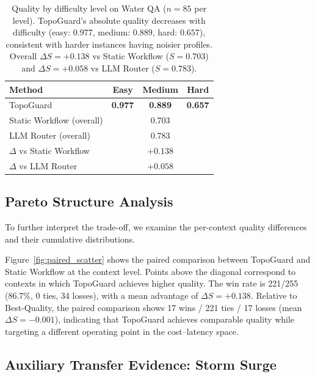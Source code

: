 \documentclass[manuscript,review,anonymous]{acmart}
\begin{document}
\begin{table}[t]
\centering
\caption{Quality by difficulty level on Water QA ($n=85$ per level). TopoGuard's absolute quality decreases with difficulty (easy: $0.977$, medium: $0.889$, hard: $0.657$), consistent with harder instances having noisier profiles. Overall $\Delta S=+0.138$ vs Static Workflow ($S=0.703$) and $\Delta S=+0.058$ vs LLM Router ($S=0.783$).}
\label{tab:difficulty_breakdown}
\small
\begin{tabular}{lccc}
\toprule
\textbf{Method} & \textbf{Easy} & \textbf{Medium} & \textbf{Hard} \\
\midrule
TopoGuard        & \textbf{0.977} & \textbf{0.889} & \textbf{0.657} \\
Static Workflow (overall) & \multicolumn{3}{c}{0.703} \\
LLM Router (overall)       & \multicolumn{3}{c}{0.783} \\
\midrule
$\Delta$ vs Static Workflow & \multicolumn{3}{c}{$+0.138$} \\
$\Delta$ vs LLM Router       & \multicolumn{3}{c}{$+0.058$} \\
\bottomrule
\end{tabular}
\end{table}



\subsection{Pareto Structure Analysis}
\label{subsec:pareto_analysis}

To further interpret the trade-off, we examine the per-context quality differences and their cumulative distributions.

Figure~\ref{fig:paired_scatter} shows the paired comparison between TopoGuard and Static Workflow at the context level. Points above the diagonal correspond to contexts in which TopoGuard achieves higher quality. The win rate is 221/255 (86.7\%, 0 ties, 34 losses), with a mean advantage of $\Delta S = +0.138$. Relative to Best-Quality, the paired comparison shows 17 wins / 221 ties / 17 losses (mean $\Delta S = -0.001$), indicating that TopoGuard achieves comparable quality while targeting a different operating point in the cost--latency space.



\subsection{Auxiliary Transfer Evidence: Storm Surge}
\label{subsec:transfer}
\end{document}
